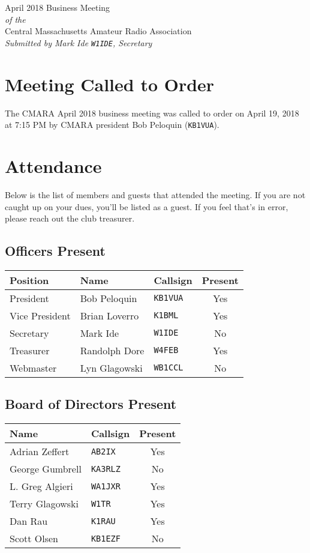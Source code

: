 \documentclass[10pt,letterpaper]{article}
\begin{document}
\begin{center}
{\huge April 2018 Business Meeting}\\
\emph{of the}\\
{\Large Central Massachusetts Amateur Radio Association}\\
\emph{Submitted by Mark Ide \texttt{W1IDE}, Secretary}
\end{center}

\section{Meeting Called to Order}
The CMARA April 2018 business meeting was called to order on April 19, 2018 at 7:15 PM by CMARA president Bob Peloquin (\texttt{KB1VUA}).

\section{Attendance}
\noindent
Below is the list of members and guests that attended the meeting. If you are not caught up on your dues, you'll be listed as a guest. If you feel that's in error, please reach out the club treasurer.

\subsection{Officers Present}
\begin{tabular}{|l|l|l|c|}
  \hline
  \textbf{Position} & \textbf{Name}  & \textbf{Callsign} & \textbf{Present} \\ \hline
  President         & Bob Peloquin   & \texttt{KB1VUA}   & Yes \\
  Vice President    & Brian Loverro  & \texttt{K1BML}    & Yes \\
  Secretary         & Mark Ide       & \texttt{W1IDE}    & No  \\
  Treasurer         & Randolph Dore  & \texttt{W4FEB}    & Yes \\
  Webmaster         & Lyn Glagowski  & \texttt{WB1CCL}   & No  \\
  \hline
\end{tabular}

\subsection{Board of Directors Present}
\begin{tabular}{|l|l|c|}
  \hline
  \textbf{Name}     & \textbf{Callsign} & \textbf{Present} \\ \hline
  Adrian Zeffert  & \texttt{AB2IX}    & Yes \\
  George Gumbrell & \texttt{KA3RLZ}   & No  \\
  L. Greg Algieri & \texttt{WA1JXR}   & Yes \\
  Terry Glagowski & \texttt{W1TR}     & Yes \\
  Dan Rau         & \texttt{K1RAU}    & Yes \\
  Scott Olsen     & \texttt{KB1EZF}   & No  \\
  \hline
\end{tabular}
\end{document}
